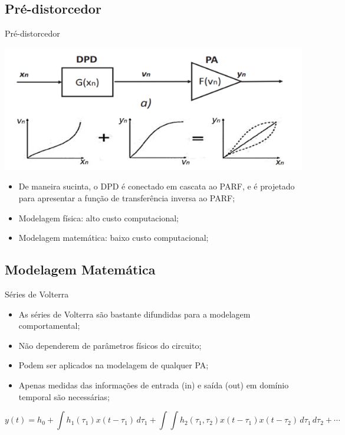 \documentclass{if-beamer}
\begin{document}
\subsection{Pré-distorcedor}
\begin{frame}{Pré-distorcedor}
\begin{minipage}{0.5\textwidth}
		
		\includegraphics[scale=0.5]{DPDCascata.png}
		
	\end{minipage}%
	\hspace{0.04\textwidth}
	\begin{minipage}{0.5\textwidth}
		\begin{itemize}
			\item De maneira sucinta, o DPD é conectado em 
			cascata ao PARF, e é projetado para apresentar a 
			função de transferência inversa ao PARF;
			\item Modelagem física: alto custo computacional;
			\item Modelagem matemática: baixo custo computacional;
		\end{itemize}
	\end{minipage}
\end{frame}
\subsection{Modelagem Matemática}
\begin{frame}{Séries de Volterra}
		\begin{itemize}
			\item As séries de Volterra são bastante difundidas para a modelagem comportamental;
			\item Não dependerem de parâmetros físicos do circuito; 
			\item Podem ser aplicados na modelagem de qualquer PA;
			\item Apenas medidas das informações de entrada (in) e saída (out) em domínio temporal são necessárias;
		\end{itemize}
		\vspace{0.05\textwidth}
			\[
		y(t) = h_0 + \int h_1(\tau_1) x(t - \tau_1) \, d\tau_1 + \int \int h_2(\tau_1, \tau_2) x(t - \tau_1) x(t - \tau_2) \, d\tau_1 \, d\tau_2 + \cdots
		\]
\end{frame}
\end{document}
